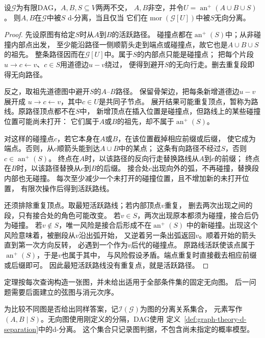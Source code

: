 \begin{theorem}[祖先道德化判据]
  \label{thm:graph-theory-ancestral-moralization}
  设\(\mathcal G\)为有限DAG，\(A,B,S\subseteq V\)两两不交，
  \(A,B\)非空，并令\(U=\operatorname{an}^{+}(A\cup B\cup S)\)。
  则\(A,B\)在\(\mathcal G\)中被\(S\) d-分离，当且仅当
  它们在\(\operatorname{mor}(\mathcal G[U])\)中被\(S\)无向分离。
\end{theorem}

\begin{proof}
先设原图有给定\(S\)时从\(A\)到\(B\)的活跃路径。
碰撞点都在\(\operatorname{an}^{+}(S)\)中；从非碰撞内部点出发，
至少能沿路径一侧顺箭头走到端点或碰撞点，故它也是\(A\cup B\cup S\)的祖先。
整条路径因而在\(\mathcal G[U]\)中。属于\(S\)的内部点只能是碰撞点；
把每个片段\(u\to c\leftarrow v\)、\(c\in S\)用道德边\(u-v\)绕过，
便得到避开\(S\)的无向行走。删去重复段即得无向路径。

反之，取祖先道德图中避开\(S\)的\(A\)--\(B\)路径。
保留骨架边，把每条新增道德边\(u-v\)展开成
\(u\to c\leftarrow v\)，其中\(c\in U\)是共同子节点。
展开结果可能重复顶点，暂称为路线。原路径顶点都不在\(S\)中，
新增顶点在插入位置是碰撞点，但路线上的某些碰撞位置可能尚未打开：
它们属于\(A\)或\(B\)的祖先，却不属于\(\operatorname{an}^{+}(S)\)。

对这样的碰撞点\(c\)，若它本身在\(A\)或\(B\)，在该位置截掉相应前缀或后缀，
使它成为端点。否则，从\(c\)顺箭头能到达\(A\cup B\)中的某点；
这条有向路径不经过\(S\)，否则\(c\in\operatorname{an}^{+}(S)\)。
终点在\(A\)时，以该路径的反向行走替换路线从\(A\)到\(c\)的前缀；
终点在\(B\)时，以该路径替换从\(c\)到\(B\)的后缀。
接合处\(c\)出现向外的弧，不再碰撞，替换段内部也无碰撞。
每次至少减少一个未打开的碰撞位置，且不增加新的未打开位置，
有限次操作后得到活跃路线。

还须排除重复顶点。取最短活跃路线；若内部顶点\(v\)重复，
删去两次出现之间的段，只有接合处的角色可能改变。
若\(v\in S\)，两次出现原本都须为碰撞，接合后仍为碰撞。
若\(v\notin S\)，唯一风险是接合后形成不在\(\operatorname{an}^{+}(S)\)
中的新碰撞。出现这个风险意味着，被删段从\(v\)沿出弧开始，
又逆着另一条出弧返回\(v\)。顺着开始的箭头直到第一次方向反转，
必遇到一个作为\(v\)后代的碰撞点。
原路线活跃使该点属于\(\operatorname{an}^{+}(S)\)，于是\(v\)也属于其中，
与风险假设矛盾。端点重复时直接截去相应前缀或后缀即可。
因此最短活跃路线没有重复点，就是活跃路径。
\end{proof}

定理按每次查询构造一张图，并未给出适用于全部条件集的固定无向图。
后一问题需要后面建立的弦图与消元次序。

为比较不同图是否给出同样答案，记\(\mathcal I(\mathcal G)\)为图的分离关系集合，
元素写作\((A,B\mid S)\)。无向图使用刚定义的分隔，DAG使用
定义~\ref{def:graph-theory-d-separation}中的d-分离。
这个集合只记录图判据，不包含尚未指定的概率模型。

